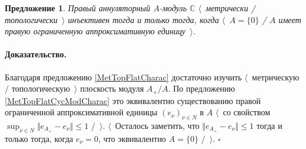 \documentclass[12pt]{article}
\newtheorem{proposition}[theorem]{Предложение}
\renewenvironment{proof}{\paragraph{Доказательство.}}{\hfill$\square$\medskip}
\begin{document}
\begin{proposition}\label{MetTopInjModCCharac} Правый аннуляторный $A$-модуль $\mathbb{C}$ $\langle$~метрически / топологически~$\rangle$ инъективен тогда и только тогда, когда $\langle$~$A=\{0\}$ / $A$  имеет правую ограниченную аппроксимативную единицу~$\rangle$.
\end{proposition}
\begin{proof} Благодаря предложению \ref{MetTopFlatCharac} достаточно изучить $\langle$~метрическую / топологическую~$\rangle$ плоскость модуля $A_+/A$. По предложению \ref{MetTopFlatCycModCharac} это эквивалентно существованию правой ограниченной аппроксимативной единицы $(e_\nu)_{\nu\in N}$ в $A$ $\langle$~со свойством $\sup_{\nu\in N}\Vert e_{A_+}-e_\nu\Vert\leq 1$ /~$\rangle$. $\langle$~Осталось заметить, что $\Vert e_{A_+}-e_\nu\Vert\leq 1$ тогда и только тогда, когда $e_\nu=0$, что эквивалентно $A=\{0\}$ /~$\rangle$.
\end{proof}
\end{document}
